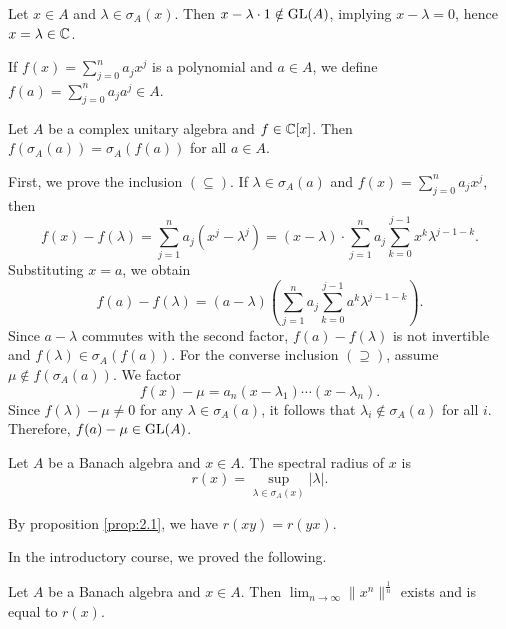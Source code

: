 \begin{myproof}
  Let $x \in A$ and $\lambda \in \sigma_A (x)$. Then $x - \lambda \cdot 1 \notin \operatorname{GL}(A)$, implying
  $x - \lambda = 0$, hence $x = \lambda \in \mathbb {C}$.
\end{myproof}

\begin{definition}
  If $f(x) = \sum_{j = 0} ^n a_j x^j$ is a polynomial and $a \in A$, we define 
  $f(a) = \sum _{j = 0} ^n a_j a^j \in A$.
\end{definition}

\begin{theorem}
  Let $A$ be a complex unitary algebra and $f \in \mathbb {C} [x]$. Then $f(\sigma_A (a)) = \sigma_A (f(a))$
  for all $a \in A$.
\end{theorem}

\begin{myproof}
  First, we prove the inclusion $(\subseteq)$.
  If $\lambda \in \sigma_A (a)$ and $f(x) = \sum_{j = 0} ^n a_j x^j$, then 
  $$f(x) - f(\lambda) = \sum_{j = 1} ^n a_j (x^j - \lambda^j) = (x - \lambda) \cdot \sum_{j = 1} ^n a_j \sum_{k = 0} ^{j -1} x^k \lambda^{j - 1 - k}.$$
  Substituting $x = a$, we obtain
  $$f(a) - f(\lambda) = (a - \lambda) \left(\sum_{j = 1} ^n a_j \sum_{k = 0} ^{j - 1} a^k \lambda^{j - 1 - k} \right).$$
  Since $a - \lambda$ commutes with the second factor, $f(a) - f(\lambda)$
  is not invertible and $f(\lambda) \in \sigma_A (f(a))$.
  For the converse inclusion $(\supseteq)$, assume $\mu \notin f(\sigma_A (a))$. We factor 
  $$f(x) - \mu = a_n (x - \lambda_1) \cdots (x - \lambda_n).$$
  Since $f(\lambda) - \mu \neq 0$ for any $\lambda \in \sigma_A (a)$, it follows that $\lambda_i \notin \sigma_A (a)$ for all $i$.
  Therefore, $f(a) - \mu \in \operatorname{GL}(A)$.
\end{myproof}

\begin{definition}
  Let $A$ be a Banach algebra and $x \in A$. The spectral radius of $x$ is 
  $$r(x) = \sup_{\lambda \in \sigma_A (x)} |\lambda|.$$
\end{definition}

\begin{remark}
  By proposition \ref{prop:2.1}, we have $r(xy) = r(yx)$.
\end{remark}

In the introductory course, we proved the following.

\begin{theorem}
  Let $A$ be a Banach algebra and $x \in A$. Then $\lim_{n \to \infty} \|x^n\|^{\frac{1}{n}}$ exists 
  and is equal to $r(x)$.
\end{theorem}

